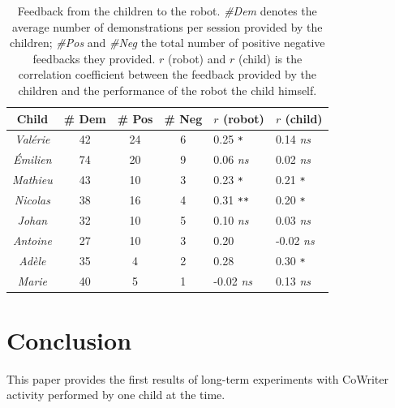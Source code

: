 \documentclass{sig-alternate}
\begin{document}
\begin{table}
    \centering
    \begin{tabular}{ccccll}
        \toprule
        \bf Child      & \bf \# Dem & \bf \# Pos & \bf \# Neg & $r$ (robot) & $r$ (child) \\ \midrule
        \emph{Val\'erie} & 42           & 24              & 6               & 0.25 \small\tt ** & 0.14 \small\it ns\\ 
        \emph{\'Emilien} & 74           & 20              & 9               & 0.06 \small\it ns & 0.02 \small\it ns\\
        \emph{Mathieu} & 43           & 10              & 3               & 0.23 \small\tt ** & 0.21 \small\tt **\\
        \emph{Nicolas} & 38           & 16              & 4               & 0.31 \small\tt *** & 0.20 \small\tt **\\
        \emph{Johan}   & 32           & 10              & 5               & 0.10 \small\it ns & 0.03 \small\it ns\\
        \emph{Antoine} & 27           & 10              & 3               & 0.20 \small\tt * & -0.02 \small\it ns \\
        \emph{Ad\`ele}   & 35           & 4               & 2               & 0.28 \small\tt * & 0.30 \small\tt ** \\
        \emph{Marie}   & 40           & 5               & 1               & -0.02 \small\it ns & 0.13 \small\it ns\\ \bottomrule
    \end{tabular}
    \caption{\small Feedback from the children to the robot. \emph{\#Dem}
        denotes the average number of demonstrations per session provided by the children;
        \emph{\#Pos} and \emph{\#Neg} the total number of positive \resp
        negative feedbacks they provided. $r$ (robot) and $r$ (child) is the correlation coefficient
        between the feedback provided by the children and the performance of the
        robot \resp the child himself.}

    \label{table:scores}
\end{table}



\section{Conclusion}
This paper provides the first results of long-term experiments 
with CoWriter activity performed by one child at the time. 
\end{document}
